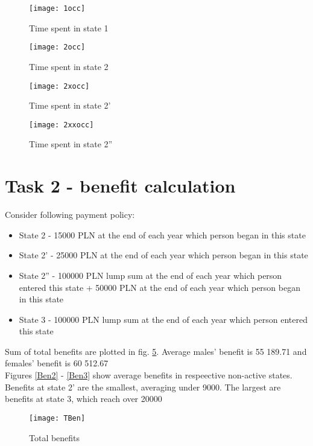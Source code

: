 \documentclass[11pt,wide]{mwart}
\begin{document}
\begin{figure}[!htbp]
	\caption{Time spent in state 1}
	\label{1occ}
	\texttt{[image: 1occ]}
	\centering
\end{figure}

\begin{figure}[!htbp]
	\caption{Time spent in state 2}
	\label{2occ}
	\texttt{[image: 2occ]}
	\centering
\end{figure}

\begin{figure}[!htbp]
	\caption{Time spent in state 2'}
	\label{2xocc}
	\texttt{[image: 2xocc]}
	\centering
\end{figure}

\begin{figure}[!htbp]
	\caption{Time spent in state 2''}
	\label{2xxocc}
	\texttt{[image: 2xxocc]}
	\centering
\end{figure}



\newpage

\section{Task 2 - benefit calculation}

Consider following payment policy:

\begin{itemize}
	\item State 2 - 15000 PLN at the end of each year which person began in this state
	\item  State 2’ - 25000 PLN at the end of each year which person began in this state
	\item  State 2” - 100000 PLN lump sum at the end of each year which person entered this state + 50000 PLN at
	the end of each year which person began in this state
	\item  State 3 - 100000 PLN lump sum at the end of each year which person entered this state
\end{itemize}

Sum of total benefits are plotted in fig. \ref{TotBen}. Average males' benefit is 55 189.71 and females' benefit is 60 512.67\\
Figures \ref{Ben2} - \ref{Ben3} show average benefits in respeective non-active states. Benefits at state 2' are the smallest, averaging under 9000. The largest are benefits at state 3, which reach over 20000

\begin{figure}[!htbp]
	\caption{Total benefits}
	\label{TotBen}
	\texttt{[image: TBen]}
	\centering
\end{figure}
\end{document}
